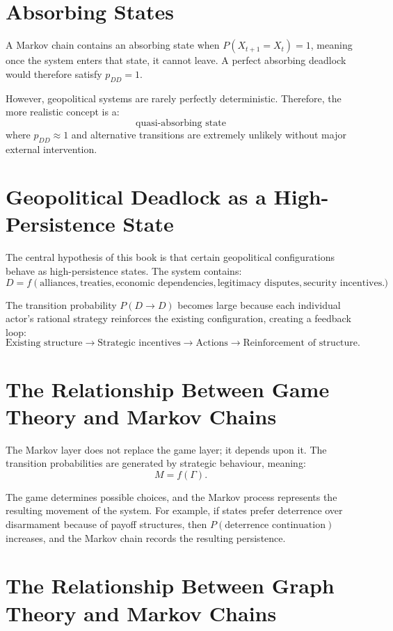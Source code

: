 \documentclass[11pt,openany]{book}
\theoremstyle{plain}
\theoremstyle{definition}
\begin{document}
\section*{Absorbing States}

A Markov chain contains an absorbing state when \(P(X_{t+1} = X_t) = 1\), meaning once the system enters that state, it cannot leave. A perfect absorbing deadlock would therefore satisfy \(p_{DD} = 1\). 

However, geopolitical systems are rarely perfectly deterministic. Therefore, the more realistic concept is a:
\[
\boxed{
\text{quasi-absorbing state}
}
\]
where \(p_{DD} \approx 1\) and alternative transitions are extremely unlikely without major external intervention.

\section*{Geopolitical Deadlock as a High-Persistence State}

The central hypothesis of this book is that certain geopolitical configurations behave as high-persistence states. The system contains:
\[
D = f(\text{alliances}, \text{treaties}, \text{economic dependencies}, \text{legitimacy disputes}, \text{security incentives}).
\]

The transition probability \(P(D \to D)\) becomes large because each individual actor's rational strategy reinforces the existing configuration, creating a feedback loop:
\[
\text{Existing structure}
\longrightarrow
\text{Strategic incentives}
\longrightarrow
\text{Actions}
\longrightarrow
\text{Reinforcement of structure}.
\]

\section*{The Relationship Between Game Theory and Markov Chains}

The Markov layer does not replace the game layer; it depends upon it. The transition probabilities are generated by strategic behaviour, meaning:
\[
M = f(\Gamma).
\]

The game determines possible choices, and the Markov process represents the resulting movement of the system. For example, if states prefer deterrence over disarmament because of payoff structures, then \(P(\text{deterrence continuation})\) increases, and the Markov chain records the resulting persistence.

\section*{The Relationship Between Graph Theory and Markov Chains}
\end{document}
